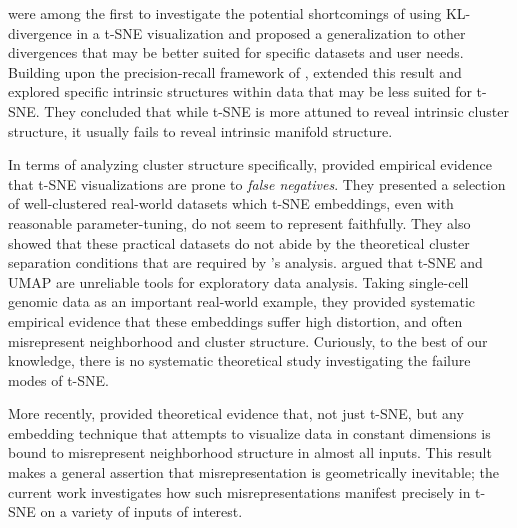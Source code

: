 \citet{bunte_aribrary_divergences} were among the first to investigate the potential shortcomings of using KL-divergence in a t-SNE visualization and proposed a generalization to other divergences that may be better suited for specific datasets and user needs.
Building upon the precision-recall framework of \citet{venna2010information},
\citet{im2018stochastic} extended this result and explored specific intrinsic structures within data that may be less suited for t-SNE. They concluded that while t-SNE is more attuned to reveal intrinsic cluster structure, it usually fails to reveal intrinsic manifold structure. 

In terms of analyzing cluster structure specifically, \citet{yang2021t} provided empirical evidence that t-SNE visualizations are prone to \emph{false negatives}. They presented a selection of well-clustered real-world datasets which t-SNE embeddings, even with reasonable parameter-tuning, do not seem to represent faithfully. They also showed that these practical datasets do not abide by the theoretical cluster separation conditions that are required by \citet{arora2018analysis}'s analysis. \citet{chari2023specious} argued that t-SNE and UMAP are unreliable tools for exploratory data analysis. Taking single-cell genomic data as an important real-world example, they provided systematic empirical evidence that these embeddings suffer high distortion, and often misrepresent neighborhood and cluster structure. Curiously, to the best of our knowledge, there is no systematic theoretical study investigating the failure modes of t-SNE.

More recently, \citet{snoeck_incompressibility} provided theoretical evidence that, not just t-SNE, but any embedding technique that attempts to visualize data in constant dimensions is bound to misrepresent neighborhood structure in almost all inputs. This result makes a  general assertion that misrepresentation is geometrically inevitable; the current work investigates how such misrepresentations manifest precisely in t-SNE on a variety of inputs of interest.




